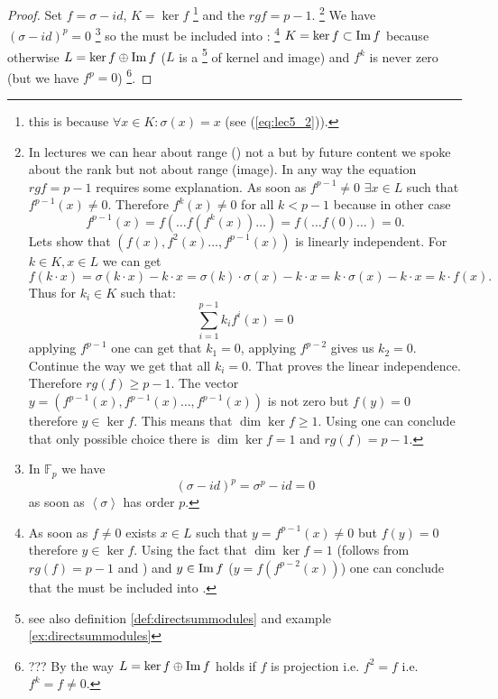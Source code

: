 \begin{theorem}
\begin{proof}
    Set $f = \sigma -id$, $K = \ker f$
    \footnote{
      this is because
      $\forall x \in K: \sigma\left(x\right) = x$ (see
      (\ref{eq:lec5_2})).
    }
    and the  $rg f = p -1$.
    \footnote{
      In lectures we can hear about range () not a
       but by future content we spoke about the rank
      but not about range (image). In any way the equation $rg f = p
      -1$ requires some explanation. As soon as $f^{p-1} \ne 0$
      $\exists x \in L$ such that $f^{p-1}\left(x\right) \ne
      0$. Therefore $f^{k}\left(x\right) \ne 0$  for all $k < p - 1$
      because in other case
      \[
      f^{p-1}\left(x\right) = f\left( \dots f\left(
      f^k\left(x\right) \right) \dots \right) =
      f\left( \dots f\left( 0 \right) \dots \right) =
      0.
      \]
      Lets show that $\left(f\left(x\right), f^2\left(x\right)\dots,
      f^{p-1}\left(x\right) \right)$ is linearly independent.
      For $k \in K, x \in L$ we can get
      \[
      f\left(k \cdot x\right) =
      \sigma\left(k \cdot x\right) - k \cdot x =
      \sigma\left(k\right) \cdot \sigma\left(x\right) -
      k \cdot x = k \cdot \sigma\left(x\right) - k \cdot x =
      k \cdot f\left(x\right).
      \]
      Thus for $k_i \in K$ such that:
      \[
      \sum_{i=1}^{p-1} k_i f^i\left(x\right) = 0
      \]
      applying $f^{p-1}$ one can get that $k_1 = 0$, applying
      $f^{p-2}$ gives us $k_2 = 0$. Continue the way we get that all
      $k_i = 0$. That proves the linear independence. Therefore
      $rg\left(f\right) \ge p - 1$. The vector
      $y = \left(f^{p-1}\left(x\right), f^{p-1}\left(x\right)\dots,
      f^{p-1}\left(x\right) \right)$ is not zero but $f(y) = 0$
      therefore $y \in \ker f$. This means that $\dim{\ker f} \ge
      1$. Using  one can conclude that only
      possible choice there is $\dim{\ker f} = 1$ and
      $rg\left(f\right) = p - 1$. 
    }
    We have 
    $\left(\sigma - id\right)^p = 0$
    \footnote{
      In $\mathbb{F}_p$ we have
      \[
      \left(\sigma - id\right)^p = \sigma^p - id = 0
      \]
      as soon as $\left<\sigma\right>$ has order $p$.      
    }
    so the  must
    be included into :
    \footnote{
      As soon as $f \ne 0$ exists $x \in L$ such that
      $y = f^{p-1}\left(x\right) \ne 0$ but $f\left(y\right) = 0$
      therefore $y \in \ker f$. Using the fact that $\dim{\ker f} = 1$
      (follows from $rg(f) = p - 1$ and ) and
      $y \in \operatorname{Im} f$ ($y = f\left(f^{p-2}\left(x\right)\right)$) one
      can conclude that  the  must
      be included into .
    }
    $K = \ker f \subset \operatorname{Im} f$
    because otherwise $L = \ker f \oplus \operatorname{Im} f$ ($L$ is a
    \footnote{
      see also definition \ref{def:directsummodules} and example
      \ref{ex:directsummodules} 
    }
    of 
    kernel and image) and $f^k$ is never zero (but we have $f^p = 0$)
    \footnote{
      ??? By the way $L = \ker f \oplus \operatorname{Im} f$ holds if $f$ is projection i.e.
      $f^2 = f$ i.e. $f^k = f \ne 0$.
    }.


\end{proof}
\end{theorem}
